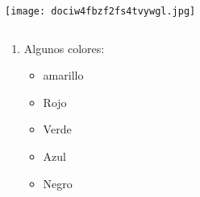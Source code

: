 \documentclass[10pt,a4paper]{article}
\begin{document}
\texttt{[image: dociw4fbzf2fs4tvywgl.jpg]} 
\title{\newpage }
\begin{equation}
[E=mc^2]
\end{equation}


\begin{enumerate}
\item Algunos colores:
\begin{itemize}
\item amarillo
\item Rojo
\item Verde
\item Azul
\item Negro
\end{itemize}
\end{enumerate}
\end{document}
